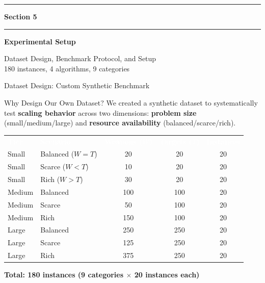 \documentclass[aspectratio=169,10pt]{beamer}
\begin{document}
{
\begin{frame}[plain]

  \begin{center}
    {\color{goldaccent}\rule{0.15\textwidth}{2pt}}
    \hspace{0.5em}
    {\color{white}\large\textbf{Section 5}}
    \hspace{0.5em}
    {\color{goldaccent}\rule{0.15\textwidth}{2pt}}

    \vspace{0.6cm}
    {\color{white}\Huge\textbf{Experimental Setup}}

    \vspace{0.4cm}
    {\color{iceblue}\normalsize Dataset Design, Benchmark Protocol, and Setup}\\[6pt]
    {\color{iceblue}\normalsize 180 instances, 4 algorithms, 9 categories}
  \end{center}
\end{frame}
}

\begin{frame}{Dataset Design: Custom Synthetic Benchmark}

  \begin{block}{Why Design Our Own Dataset?}
    We created a synthetic dataset to systematically test \textbf{scaling behavior} across two dimensions: \textbf{problem size} (small/medium/large) and \textbf{resource availability} (balanced/scarce/rich).
  \end{block}

  \vspace{0.2cm}
  \begin{center}
  \small
  \begin{tabular}{llccc}
    \toprule
    \rowcolor{DarkSlate}
    \textcolor{white}{\textbf{Tier}} &
    \textcolor{white}{\textbf{Scenario}} &
    \textcolor{white}{\textbf{Weapons ($W$)}} &
    \textcolor{white}{\textbf{Targets ($T$)}} &
    \textcolor{white}{\textbf{Instances}} \\
    Small & Balanced ($W = T$) & 20 & 20 & 20 \\
    Small & Scarce ($W < T$) & 10 & 20 & 20 \\
    Small & Rich ($W > T$) & 30 & 20 & 20 \\
    \midrule
    Medium & Balanced & 100 & 100 & 20 \\
    Medium & Scarce & 50 & 100 & 20 \\
    Medium & Rich & 150 & 100 & 20 \\
    \midrule
    Large & Balanced & 250 & 250 & 20 \\
    Large & Scarce & 125 & 250 & 20 \\
    Large & Rich & 375 & 250 & 20 \\
    \bottomrule
  \end{tabular}
  \end{center}

  \vspace{0.2cm}
  \begin{center}
  {\small\bfseries\color{navydark} Total: 180 instances
    (9 categories $\times$ 20 instances each)}
  \end{center}
\end{frame}
\end{document}
